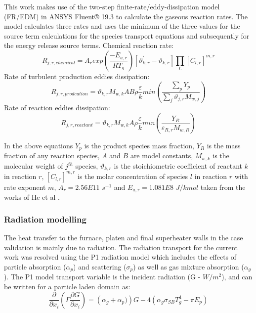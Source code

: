 \documentclass{webofc}
\begin{document}
This work makes use of the two-step finite-rate/eddy-dissipation model (FR/EDM) in ANSYS Fluent® 19.3 \cite{ansys} to calculate the gaseous reaction rates. The model calculates three rates and uses the minimum of the three values for the source term calculations for the species transport equations and subsequently for the energy release source terms.
Chemical reaction rate:
\begin{equation}\label{eqn_rate_chemical}
R_{j,r,chemical}=A_{r}exp\left(\frac{-E_{a,r}}{RT_g}\right)\left[\vartheta^{'}_{k,r}-\vartheta_{k,r}\right]\prod_{L}\left[C_{l,r}\right]^{m,r}
\end{equation}
Rate of turbulent production eddies dissipation:
\begin{equation}\label{eqn_rate_products}
R_{j,r,prodcution}=\vartheta_{k,r}M_{w,k}AB\rho\frac{\varepsilon}{k}min\left(\frac{\sum_{p} Y_p}{\sum_{j}\vartheta_{j,r}M_{w,j}}\right)
\end{equation}
Rate of reaction eddies dissipation:
\begin{equation}\label{eqn_rate_reactants}
R_{j,r,reactant}=\vartheta_{k,r}M_{w,k}A\rho\frac{\varepsilon}{k}min\left(\frac{Y_R}{\varepsilon_{R,r}M_{w,R}}\right)
\end{equation}

In the above equations $Y_p$ is the product species mass fraction, $Y_R$ is the mass fraction of any reaction species, $A$ and $B$ are model constants, $M_{w,k}$ is the molecular weight of $j^{th}$ species, $\vartheta_{k,r}$ is the stoichiometric coefficient of reactant $k$ in reaction $r$, $[C_{l,r}]^{m,r}$ is the molar concentration of species $l$ in reaction $r$ with rate exponent $m$, $A_r=2.56E11$ $s^{-1}$ and $E_{a,r}=1.081E8$ $J/kmol$ taken from the works of He et al \cite{he}.   
\subsubsection{Radiation modelling}

The heat transfer to the furnace, platen and final superheater walls in the case validation is mainly due to radiation. The radiation transport for the current work was resolved using the P1 radiation model which includes the effects of particle absorption ($\alpha_p$) and scattering ($\sigma_p$) as well as gas mixture absorption ($\alpha_g$). The P1 model transport variable is the incident radiation (G - $W/m^2$), and can be written for a particle laden domain as:
\begin{equation}
\frac{\partial}{\partial x_{i}}\left(\Gamma\frac{\partial G}{\partial x_{i}}\right)=\left(\alpha_g+\alpha_p)\right)G-4\left(\alpha_g \sigma_{SB} T_{g}^4-\pi E_p \right)
\end{equation}
\end{document}
